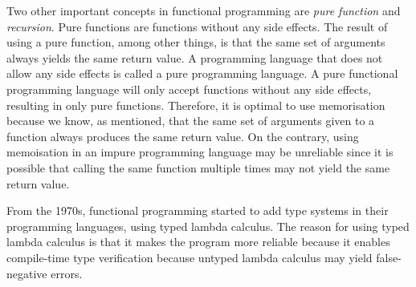 \para
Two other important concepts in functional programming are \emph{pure function} and \emph{recursion}. Pure functions are functions without any side effects. The result of using a pure function, among other things, is that the same set of arguments always yields the same return value. A programming language that does not allow any side effects is called a pure programming language. A pure functional programming language will only accept functions without any side effects, resulting in only pure functions. Therefore, it is optimal to use memorisation because we know, as mentioned, that the same set of arguments given to a function always produces the same return value. On the contrary, using memoisation in an impure programming language may be unreliable since it is possible that calling the same function multiple times may not yield the same return value. 

\para
From the 1970s, functional programming started to add type systems in their programming languages, using typed lambda calculus. The reason for using typed lambda calculus is that it makes the program more reliable because it enables compile-time type verification because untyped lambda calculus may yield false-negative errors. 